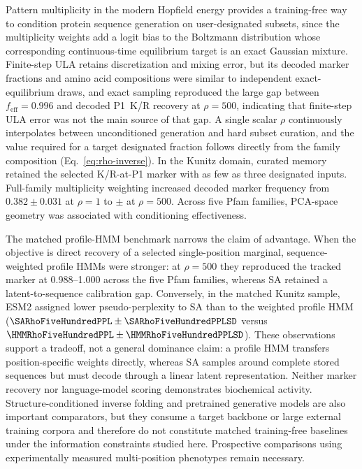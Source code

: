 Pattern multiplicity in the modern Hopfield energy provides a training-free way to condition
protein sequence generation on user-designated subsets, since the multiplicity weights add a
logit bias to the Boltzmann distribution whose corresponding continuous-time equilibrium
target is an exact Gaussian mixture. Finite-step ULA retains discretization and mixing error,
but its decoded marker fractions and amino acid compositions were similar to independent
exact-equilibrium draws, and exact sampling reproduced the large gap between
$f_{\mathrm{eff}}=0.996$ and decoded P1~K/R recovery at $\rho=500$, indicating that
finite-step ULA error was not the main source of that gap. A single scalar $\rho$ continuously
interpolates between unconditioned generation and hard subset curation, and the value required
for a target designated fraction follows directly from the family composition
(Eq.~\ref{eq:rho-inverse}). In the Kunitz domain, curated memory retained the selected
K/R-at-P1 marker with as few as three designated inputs. Full-family multiplicity weighting
increased decoded marker frequency from $0.382\pm0.031$ at $\rho=1$ to
\KunitzFobsFiveHundred{} $\pm$ \KunitzFobsFiveHundredSD{} at $\rho=500$. Across five Pfam
families, PCA-space geometry was associated with conditioning effectiveness.

The matched profile-HMM benchmark narrows the claim of advantage. When the objective is direct
recovery of a selected single-position marginal, sequence-weighted profile HMMs were stronger:
at $\rho=500$ they reproduced the tracked marker at 0.988--1.000 across the five Pfam
families, whereas SA retained a latent-to-sequence calibration gap. Conversely, in the matched
Kunitz sample, ESM2 assigned lower pseudo-perplexity to SA than to the weighted profile HMM
($\SARhoFiveHundredPPL\pm\SARhoFiveHundredPPLSD$ versus
$\HMMRhoFiveHundredPPL\pm\HMMRhoFiveHundredPPLSD$). These observations support a tradeoff,
not a general dominance claim: a profile HMM transfers position-specific weights directly,
whereas SA samples around complete stored sequences but must decode through a linear latent
representation. Neither marker recovery nor language-model scoring demonstrates biochemical
activity. Structure-conditioned inverse folding and pretrained generative models are also
important comparators, but they consume a target backbone or large external training corpora and
therefore do not constitute matched training-free baselines under the information constraints
studied here. Prospective comparisons using experimentally measured multi-position phenotypes
remain necessary.

